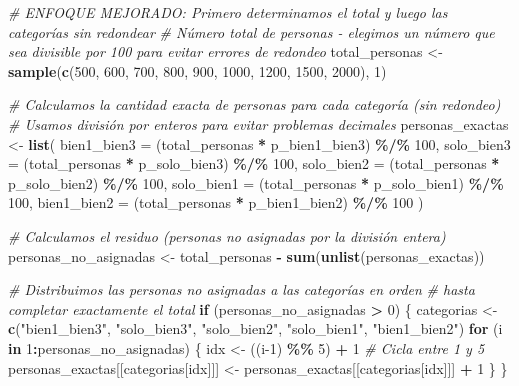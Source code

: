\documentclass[
]{article}
\newenvironment{Shaded}{\begin{snugshade}}{\end{snugshade}}
\newcommand{\AttributeTok}[1]{\textcolor[rgb]{0.13,0.29,0.53}{#1}}
\newcommand{\CommentTok}[1]{\textcolor[rgb]{0.56,0.35,0.01}{\textit{#1}}}
\newcommand{\ControlFlowTok}[1]{\textcolor[rgb]{0.13,0.29,0.53}{\textbf{#1}}}
\newcommand{\DecValTok}[1]{\textcolor[rgb]{0.00,0.00,0.81}{#1}}
\newcommand{\FunctionTok}[1]{\textcolor[rgb]{0.13,0.29,0.53}{\textbf{#1}}}
\newcommand{\NormalTok}[1]{#1}
\newcommand{\OtherTok}[1]{\textcolor[rgb]{0.56,0.35,0.01}{#1}}
\newcommand{\SpecialCharTok}[1]{\textcolor[rgb]{0.81,0.36,0.00}{\textbf{#1}}}
\newcommand{\StringTok}[1]{\textcolor[rgb]{0.31,0.60,0.02}{#1}}
\begin{document}
\begin{Shaded}
\begin{Highlighting}[]
\CommentTok{\# ENFOQUE MEJORADO: Primero determinamos el total y luego las categorías sin redondear}
\CommentTok{\# Número total de personas {-} elegimos un número que sea divisible por 100 para evitar errores de redondeo}
\NormalTok{total\_personas }\OtherTok{\textless{}{-}} \FunctionTok{sample}\NormalTok{(}\FunctionTok{c}\NormalTok{(}\DecValTok{500}\NormalTok{, }\DecValTok{600}\NormalTok{, }\DecValTok{700}\NormalTok{, }\DecValTok{800}\NormalTok{, }\DecValTok{900}\NormalTok{, }\DecValTok{1000}\NormalTok{, }\DecValTok{1200}\NormalTok{, }\DecValTok{1500}\NormalTok{, }\DecValTok{2000}\NormalTok{), }\DecValTok{1}\NormalTok{)}

\CommentTok{\# Calculamos la cantidad exacta de personas para cada categoría (sin redondeo)}
\CommentTok{\# Usamos división por enteros para evitar problemas decimales}
\NormalTok{personas\_exactas }\OtherTok{\textless{}{-}} \FunctionTok{list}\NormalTok{(}
  \AttributeTok{bien1\_bien3 =}\NormalTok{ (total\_personas }\SpecialCharTok{*}\NormalTok{ p\_bien1\_bien3) }\SpecialCharTok{\%/\%} \DecValTok{100}\NormalTok{,}
  \AttributeTok{solo\_bien3 =}\NormalTok{ (total\_personas }\SpecialCharTok{*}\NormalTok{ p\_solo\_bien3) }\SpecialCharTok{\%/\%} \DecValTok{100}\NormalTok{,}
  \AttributeTok{solo\_bien2 =}\NormalTok{ (total\_personas }\SpecialCharTok{*}\NormalTok{ p\_solo\_bien2) }\SpecialCharTok{\%/\%} \DecValTok{100}\NormalTok{,}
  \AttributeTok{solo\_bien1 =}\NormalTok{ (total\_personas }\SpecialCharTok{*}\NormalTok{ p\_solo\_bien1) }\SpecialCharTok{\%/\%} \DecValTok{100}\NormalTok{,}
  \AttributeTok{bien1\_bien2 =}\NormalTok{ (total\_personas }\SpecialCharTok{*}\NormalTok{ p\_bien1\_bien2) }\SpecialCharTok{\%/\%} \DecValTok{100}
\NormalTok{)}

\CommentTok{\# Calculamos el residuo (personas no asignadas por la división entera)}
\NormalTok{personas\_no\_asignadas }\OtherTok{\textless{}{-}}\NormalTok{ total\_personas }\SpecialCharTok{{-}} \FunctionTok{sum}\NormalTok{(}\FunctionTok{unlist}\NormalTok{(personas\_exactas))}

\CommentTok{\# Distribuimos las personas no asignadas a las categorías en orden}
\CommentTok{\# hasta completar exactamente el total}
\ControlFlowTok{if}\NormalTok{ (personas\_no\_asignadas }\SpecialCharTok{\textgreater{}} \DecValTok{0}\NormalTok{) \{}
\NormalTok{  categorias }\OtherTok{\textless{}{-}} \FunctionTok{c}\NormalTok{(}\StringTok{"bien1\_bien3"}\NormalTok{, }\StringTok{"solo\_bien3"}\NormalTok{, }\StringTok{"solo\_bien2"}\NormalTok{, }\StringTok{"solo\_bien1"}\NormalTok{, }\StringTok{"bien1\_bien2"}\NormalTok{)}
  \ControlFlowTok{for}\NormalTok{ (i }\ControlFlowTok{in} \DecValTok{1}\SpecialCharTok{:}\NormalTok{personas\_no\_asignadas) \{}
\NormalTok{    idx }\OtherTok{\textless{}{-}}\NormalTok{ ((i}\DecValTok{{-}1}\NormalTok{) }\SpecialCharTok{\%\%} \DecValTok{5}\NormalTok{) }\SpecialCharTok{+} \DecValTok{1}  \CommentTok{\# Cicla entre 1 y 5}
\NormalTok{    personas\_exactas[[categorias[idx]]] }\OtherTok{\textless{}{-}}\NormalTok{ personas\_exactas[[categorias[idx]]] }\SpecialCharTok{+} \DecValTok{1}
\NormalTok{  \}}
\NormalTok{\}}


\end{Highlighting}
\end{Shaded}
\end{document}
